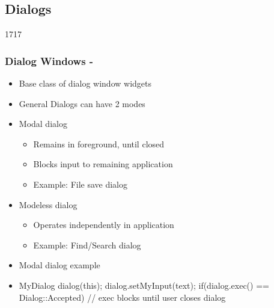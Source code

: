 %
%
%
%

\subsection{Dialogs}

\begin{slide}[fragile]{1717}\frametitle{Dialog Windows - }
  \begin{itemize}
  \item Base class of dialog window widgets
  \item General Dialogs can have 2 modes
  \item Modal dialog
  \begin{itemize}
  \item Remains in foreground, until closed
 \item Blocks input to remaining application
 \item Example: File save dialog
   \end{itemize}
  \item Modeless dialog
  \begin{itemize}
  \item Operates independently in application
   \item Example: Find/Search dialog
   \end{itemize}
  \item Modal dialog example
 \item[] 
    \begin{cpp}
MyDialog dialog(this);
dialog.setMyInput(text);
if(dialog.exec() == Dialog::Accepted) {
  // exec blocks until user closes dialog
}
    \end{cpp}
  \end{itemize}
\end{slide}

